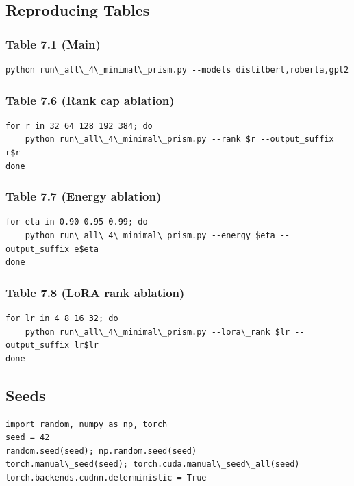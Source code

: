 \subsection{Reproducing Tables}

\subsubsection{Table 7.1 (Main)}
\begin{lstlisting}
python run\_all\_4\_minimal\_prism.py --models distilbert,roberta,gpt2
\end{lstlisting}

\subsubsection{Table 7.6 (Rank cap ablation)}
\begin{lstlisting}
for r in 32 64 128 192 384; do
    python run\_all\_4\_minimal\_prism.py --rank $r --output_suffix r$r
done
\end{lstlisting}

\subsubsection{Table 7.7 (Energy ablation)}
\begin{lstlisting}
for eta in 0.90 0.95 0.99; do
    python run\_all\_4\_minimal\_prism.py --energy $eta --output_suffix e$eta
done
\end{lstlisting}

\subsubsection{Table 7.8 (LoRA rank ablation)}
\begin{lstlisting}
for lr in 4 8 16 32; do
    python run\_all\_4\_minimal\_prism.py --lora\_rank $lr --output_suffix lr$lr
done
\end{lstlisting}

\subsection{Seeds}

\begin{lstlisting}
import random, numpy as np, torch
seed = 42
random.seed(seed); np.random.seed(seed)
torch.manual\_seed(seed); torch.cuda.manual\_seed\_all(seed)
torch.backends.cudnn.deterministic = True
\end{lstlisting}

